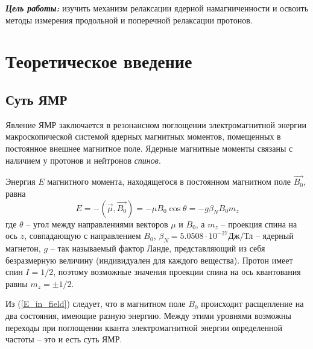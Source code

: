 \begin{center}
	\vspace{0.5cm}
	{\parbox{16cm}
		{\small{
			}
		}
	}
\end{center}

\textbf{\emph{Цель работы:}}
изучить механизм релаксации ядерной намагниченности и освоить методы измерения продольной и поперечной релаксации протонов.
\section{Теоретическое введение}
\subsection{Суть ЯМР}
Явление ЯМР заключается в резонансном поглощении электромагнитной энергии макроскопической системой ядерных магнитных моментов, помещенных в постоянное внешнее магнитное поле. Ядерные магнитные моменты связаны с наличием у протонов и нейтронов \textit{спинов}.

Энергия $E$ магнитного момента, находящегося в постоянном магнитном поле $\vec{B_0}$, равна
\begin{equation}
\label{E_in_field}
E = - (\vec{\mu}, \vec{B_0}) = -\mu B_0 \cos \theta = - g \beta_N B_0 m_z
\end{equation}
где $\theta$ -- угол между направлениями векторов $\mu$ и $B_0$, а $ m_z $ -- проекция спина на ось $z$, совпадающую с направлением $ B_0 $, $\beta_N = 5.0508 \cdot 10^{-27} \text{Дж}/\text{Тл}$ -- ядерный магнетон, $g$ -- так называемый фактор Ланде, представляющий из себя безразмерную величину (индивидуален для каждого вещества).
Протон имеет спин $ I = 1/2 $, поэтому возможные значения проекции спина на ось квантования равны $ m_z = \pm 1/2 $.

Из (\ref{E_in_field}) следует, что в магнитном поле $B_0$ происходит расщепление на два состояния, имеющие разную энергию.
Между этими уровнями возможны переходы при поглощении кванта электромагнитной энергии определенной частоты -- это и есть суть ЯМР.


